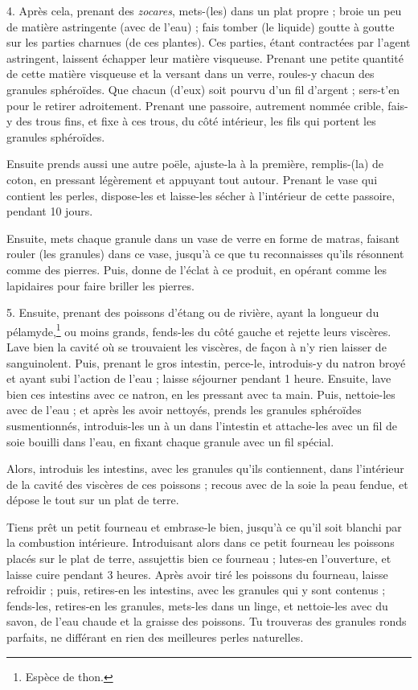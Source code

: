 \documentclass[a4paper, 11pt, oneside, polutonikogreek, french]{article}
\begin{document}
4. Après cela, prenant des \emph{zocares}, mets-(les) dans un plat propre ; broie un peu de matière astringente (avec de l'eau) ; fais tomber (le liquide) goutte à goutte sur les parties charnues (de ces plantes). Ces parties, étant contractées par l'agent astringent, laissent échapper leur matière visqueuse. Prenant une petite quantité de cette matière visqueuse et la versant dans un verre, roules-y chacun des granules sphéroïdes. Que chacun (d'eux) soit pourvu d'un fil d'argent ; sers-t'en pour le retirer adroitement. Prenant une passoire, autrement nommée crible, fais-y des trous fins, et fixe à ces trous, du côté intérieur, les fils qui portent les granules sphéroïdes.

Ensuite prends aussi une autre poële, ajuste-la à la première, remplis-(la) de coton, en pressant légèrement et appuyant tout autour. Prenant le vase qui contient les perles, dispose-les et laisse-les sécher à l'intérieur de cette passoire, pendant 10 jours.

Ensuite, mets chaque granule dans un vase de verre en forme de matras, faisant rouler (les granules) dans ce vase, jusqu'à ce que tu reconnaisses qu'ils résonnent comme des pierres. Puis, donne de l'éclat à ce produit, en opérant comme les lapidaires pour faire briller les pierres.

5. Ensuite, prenant des poissons d'étang ou de rivière, ayant la longueur du pélamyde,\footnote{Espèce de thon.} ou moins grands, fends-les du côté gauche et rejette leurs viscères. Lave bien la cavité où se trouvaient les viscères, de façon à n'y rien laisser de sanguinolent. Puis, prenant le gros intestin, perce-le, introduis-y du natron broyé et ayant subi l'action de l'eau ; laisse séjourner pendant 1 heure. Ensuite, lave bien ces intestins avec ce natron, en les pressant avec ta main. Puis, nettoie-les avec de l'eau ; et après les avoir nettoyés, prends les granules sphéroïdes susmentionnés, introduis-les un à un dans l'intestin et attache-les avec un fil de soie bouilli dans l'eau, en fixant chaque granule avec un fil spécial.

Alors, introduis les intestins, avec les granules qu'ils contiennent, dans l'intérieur de la cavité des viscères de ces poissons ; recous avec de la soie la peau fendue, et dépose le tout sur un plat de terre.

Tiens prêt un petit fourneau et embrase-le bien, jusqu'à ce qu'il soit blanchi par la combustion intérieure. Introduisant alors dans ce petit fourneau les poissons placés sur le plat de terre, assujettis bien ce fourneau ; lutes-en l'ouverture, et laisse cuire pendant 3 heures. Après avoir tiré les poissons du fourneau, laisse refroidir ; puis, retires-en les intestins, avec les granules qui y sont contenus ; fends-les, retires-en les granules, mets-les dans un linge, et nettoie-les avec du savon, de l'eau chaude et la graisse des poissons. Tu trouveras des granules ronds parfaits, ne différant en rien des meilleures perles naturelles.
\end{document}
